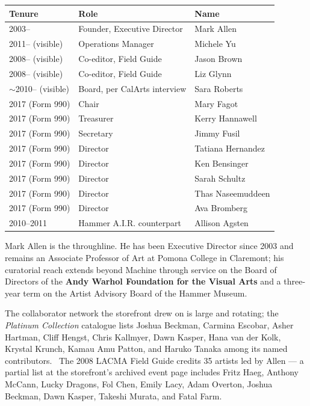 \documentclass[10pt,letterpaper,twocolumn]{article}
\begin{document}
\begin{table}[h]
\footnotesize
\centering
\setlength{\tabcolsep}{3pt}
\begin{tabularx}{\columnwidth}{l>{\raggedright\arraybackslash\hspace{0pt}}X>{\raggedright\arraybackslash\hspace{0pt}}X}
\toprule
\textbf{Tenure} & \textbf{Role} & \textbf{Name} \\
\midrule
2003-- & Founder, Executive Director & Mark Allen \\
2011-- (visible) & Operations Manager & Michele Yu \\
2008-- (visible) & Co-editor, Field Guide & Jason Brown \\
2008-- (visible) & Co-editor, Field Guide & Liz Glynn \\
$\sim$2010-- (visible) & Board, per CalArts interview & Sara Roberts \\
2017 (Form 990) & Chair & Mary Fagot \\
2017 (Form 990) & Treasurer & Kerry Hannawell \\
2017 (Form 990) & Secretary & Jimmy Fusil \\
2017 (Form 990) & Director & Tatiana Hernandez \\
2017 (Form 990) & Director & Ken Bensinger \\
2017 (Form 990) & Director & Sarah Schultz \\
2017 (Form 990) & Director & Thas Naseemuddeen \\
2017 (Form 990) & Director & Ava Bromberg \\
2010--2011 & Hammer A.I.R. counterpart & Allison Agsten \\
\bottomrule
\end{tabularx}
\end{table}

Mark Allen is the throughline. He has been Executive Director since 2003 and remains an Associate Professor of Art at Pomona College in Claremont; his curatorial reach extends beyond Machine through service on the Board of Directors of the \textbf{Andy Warhol Foundation for the Visual Arts} and a three-year term on the Artist Advisory Board of the Hammer Museum.~\citep{calarts2010,markallensite}

The collaborator network the storefront drew on is large and rotating; the \emph{Platinum Collection} catalogue lists Joshua Beckman, Carmina Escobar, Asher Hartman, Cliff Hengst, Chris Kallmyer, Dawn Kasper, Hana van der Kolk, Krystal Krunch, Kamau Amu Patton, and Haruko Tanaka among its named contributors.~\citep{tangbook} The 2008 LACMA Field Guide credits 35 artists led by Allen --- a partial list at the storefront's archived event page includes Fritz Haeg, Anthony McCann, Lucky Dragons, Fol Chen, Emily Lacy, Adam Overton, Joshua Beckman, Dawn Kasper, Takeshi Murata, and Fatal Farm.~\citep{lacmafieldguide}
\end{document}
